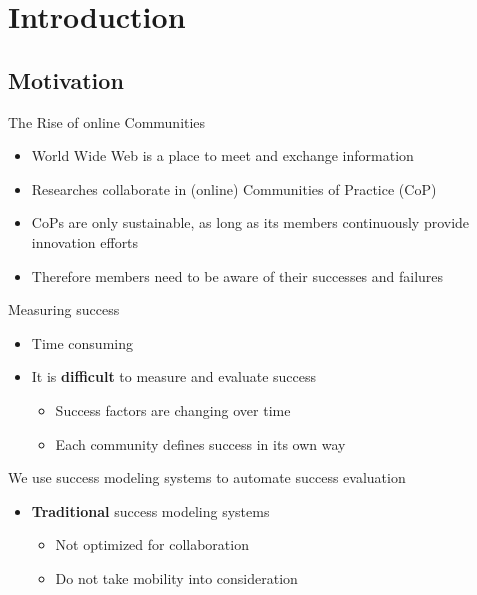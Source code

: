 \section{Introduction}

\subsection{Motivation}


\begin{frame}{The Rise of online Communities}
  \begin{itemize}
    \item World Wide Web is a place to meet and exchange information
    \item Researches collaborate in (online) Communities of Practice (CoP)
    \item CoPs are only sustainable, as long as its members continuously provide innovation efforts \cite{RKJa15}
    \item Therefore members need to be aware of their successes and failures
  \end{itemize}

\end{frame}

\begin{frame}{Measuring success}
  \begin{itemize}
    \item Time consuming
    \item It is \textbf{difficult} to measure and evaluate success
          \begin{itemize}
            \item Success factors are changing over time \cite{Renz08}
            \item Each community defines success in its own way
          \end{itemize}
  \end{itemize}
 We use success modeling systems to automate success evaluation
    \begin{itemize}
        \item \textbf{Traditional} success modeling systems 
          \begin{itemize}
            \item Not optimized for collaboration
            \item Do not take mobility into consideration \cite{Renz08}
          \end{itemize}
  \end{itemize}
\end{frame}

